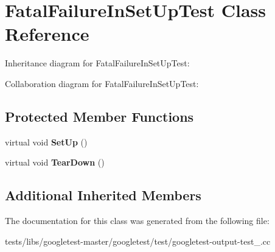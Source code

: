 \hypertarget{classFatalFailureInSetUpTest}{}\section{Fatal\+Failure\+In\+Set\+Up\+Test Class Reference}
\label{classFatalFailureInSetUpTest}


Inheritance diagram for Fatal\+Failure\+In\+Set\+Up\+Test\+:


Collaboration diagram for Fatal\+Failure\+In\+Set\+Up\+Test\+:
\subsection*{Protected Member Functions}
\begin{DoxyCompactItemize}
\item 
\mbox{\label{classFatalFailureInSetUpTest_a455696f86fb5f5393624221ccb79b373}} 
virtual void {\bfseries Set\+Up} ()
\item 
\mbox{\label{classFatalFailureInSetUpTest_a457707161063e08f7b6600ec5db449e4}} 
virtual void {\bfseries Tear\+Down} ()
\end{DoxyCompactItemize}
\subsection*{Additional Inherited Members}


The documentation for this class was generated from the following file\+:\begin{DoxyCompactItemize}
\item 
tests/libs/googletest-\/master/googletest/test/googletest-\/output-\/test\+\_\+.\+cc\end{DoxyCompactItemize}
